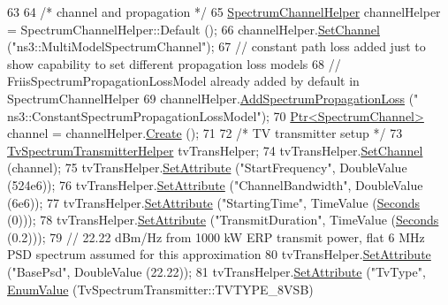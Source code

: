 \begin{DoxyCode}
63 
64   \textcolor{comment}{/* channel and propagation */}
65   \hyperlink{classns3_1_1SpectrumChannelHelper}{SpectrumChannelHelper} channelHelper = SpectrumChannelHelper::Default ();
66   channelHelper.\hyperlink{classns3_1_1SpectrumChannelHelper_a11ffe86edea8cdd30f181e41c0e3e29f}{SetChannel} (\textcolor{stringliteral}{"ns3::MultiModelSpectrumChannel"});
67   \textcolor{comment}{// constant path loss added just to show capability to set different propagation loss models}
68   \textcolor{comment}{// FriisSpectrumPropagationLossModel already added by default in SpectrumChannelHelper}
69   channelHelper.\hyperlink{classns3_1_1SpectrumChannelHelper_a135e8ad3b8399671db56d112929f9611}{AddSpectrumPropagationLoss} (\textcolor{stringliteral}{"
      ns3::ConstantSpectrumPropagationLossModel"});
70   \hyperlink{classns3_1_1Ptr}{Ptr<SpectrumChannel>} channel = channelHelper.\hyperlink{classns3_1_1SpectrumChannelHelper_a419ea84f5046763085f94f38af319fb9}{Create} ();
71   
72   \textcolor{comment}{/* TV transmitter setup */}
73   \hyperlink{classns3_1_1TvSpectrumTransmitterHelper}{TvSpectrumTransmitterHelper} tvTransHelper;
74   tvTransHelper.\hyperlink{classns3_1_1TvSpectrumTransmitterHelper_a14d44a79d659b99a2e80916eadefbd54}{SetChannel} (channel);
75   tvTransHelper.\hyperlink{classns3_1_1TvSpectrumTransmitterHelper_af602e03cad3ae4cabafcb127c888fb53}{SetAttribute} (\textcolor{stringliteral}{"StartFrequency"}, DoubleValue (524e6));
76   tvTransHelper.\hyperlink{classns3_1_1TvSpectrumTransmitterHelper_af602e03cad3ae4cabafcb127c888fb53}{SetAttribute} (\textcolor{stringliteral}{"ChannelBandwidth"}, DoubleValue (6e6));
77   tvTransHelper.\hyperlink{classns3_1_1TvSpectrumTransmitterHelper_af602e03cad3ae4cabafcb127c888fb53}{SetAttribute} (\textcolor{stringliteral}{"StartingTime"}, TimeValue (\hyperlink{group__timecivil_ga33c34b816f8ff6628e33d5c8e9713b9e}{Seconds} (0)));
78   tvTransHelper.\hyperlink{classns3_1_1TvSpectrumTransmitterHelper_af602e03cad3ae4cabafcb127c888fb53}{SetAttribute} (\textcolor{stringliteral}{"TransmitDuration"}, TimeValue (\hyperlink{group__timecivil_ga33c34b816f8ff6628e33d5c8e9713b9e}{Seconds} (0.2)));
79   \textcolor{comment}{// 22.22 dBm/Hz from 1000 kW ERP transmit power, flat 6 MHz PSD spectrum assumed for this approximation }
80   tvTransHelper.\hyperlink{classns3_1_1TvSpectrumTransmitterHelper_af602e03cad3ae4cabafcb127c888fb53}{SetAttribute} (\textcolor{stringliteral}{"BasePsd"}, DoubleValue (22.22)); 
81   tvTransHelper.\hyperlink{classns3_1_1TvSpectrumTransmitterHelper_af602e03cad3ae4cabafcb127c888fb53}{SetAttribute} (\textcolor{stringliteral}{"TvType"}, \hyperlink{classns3_1_1EnumValue}{EnumValue} (TvSpectrumTransmitter::TVTYPE\_8VSB)

\end{DoxyCode}
